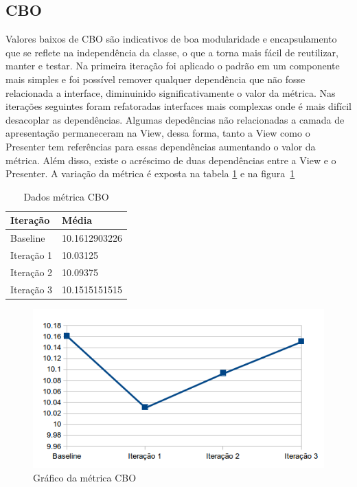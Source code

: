 \subsection{CBO}

Valores baixos de CBO são indicativos de boa modularidade e encapsulamento que
se reflete na independência da classe, o que a torna mais fácil de reutilizar,
manter e testar.
Na primeira iteração foi aplicado o padrão em um componente mais simples e foi
possível remover qualquer dependência que não fosse relacionada a interface,
diminuinido significativamente o valor da métrica. Nas iterações seguintes foram
refatoradas interfaces mais complexas onde é mais difícil desacoplar as
dependências. Algumas depedências não relacionadas a camada de apresentação
permaneceram na View, dessa forma, tanto a View como o Presenter tem referências
para essas dependências aumentando o valor da métrica. Além disso, existe o
acréscimo de duas dependências entre a View e o Presenter. A variação da métrica
é exposta na tabela \ref{tab:cbo} e na figura~\ref{fig:cbo}

\begin{table}[!h]
	\centering
	    \caption{Dados métrica CBO}
	
    \begin{tabular}{ | l | l | }
    \hline
    Iteração & Média 			\\ \hline
    Baseline & 10.1612903226   	\\ \hline
    Iteração 1 & 10.03125		\\ \hline
	Iteração 2 & 10.09375		\\ \hline
	Iteração 3 & 10.1515151515	\\ \hline
    \end{tabular}
    \label{tab:cbo}
\end{table}

\begin{figure}[!htb]
	\label{fig:cbo}
	\caption{Gráfico da métrica CBO}   
	\begin{center}
		\includegraphics{img/cbo.png}
	\end{center}
\end{figure}


